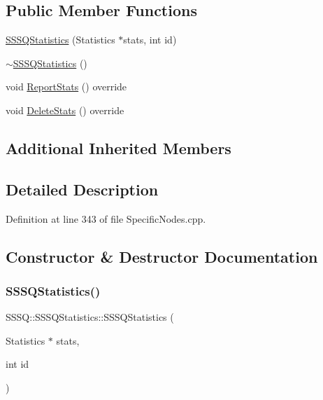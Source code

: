 \subsection*{Public Member Functions}
\begin{DoxyCompactItemize}
\item 
\hyperlink{class_s_s_s_q_1_1_s_s_s_q_statistics_a798ff0289d3fcb85cd827ce0bc02babe}{S\+S\+S\+Q\+Statistics} (Statistics $\ast$stats, int id)
\item 
\hyperlink{class_s_s_s_q_1_1_s_s_s_q_statistics_a6e067067219125f919a9ee526324363b}{$\sim$\+S\+S\+S\+Q\+Statistics} ()
\item 
void \hyperlink{class_s_s_s_q_1_1_s_s_s_q_statistics_ab53eda9d3355dec31021cbdba9333c85}{Report\+Stats} () override
\item 
void \hyperlink{class_s_s_s_q_1_1_s_s_s_q_statistics_a8cddfec8ce3d2f4b31c15f3d07822b05}{Delete\+Stats} () override
\end{DoxyCompactItemize}
\subsection*{Additional Inherited Members}


\subsection{Detailed Description}


Definition at line 343 of file Specific\+Nodes.\+cpp.



\subsection{Constructor \& Destructor Documentation}
\mbox{\label{class_s_s_s_q_1_1_s_s_s_q_statistics_a798ff0289d3fcb85cd827ce0bc02babe}} 
\subsubsection{\texorpdfstring{S\+S\+S\+Q\+Statistics()}{SSSQStatistics()}}
{\footnotesize\ttfamily S\+S\+S\+Q\+::\+S\+S\+S\+Q\+Statistics\+::\+S\+S\+S\+Q\+Statistics (\begin{DoxyParamCaption}\item[{Statistics $\ast$}]{stats,  }\item[{int}]{id }\end{DoxyParamCaption})\hspace{0.3cm}{\ttfamily [inline]}}




